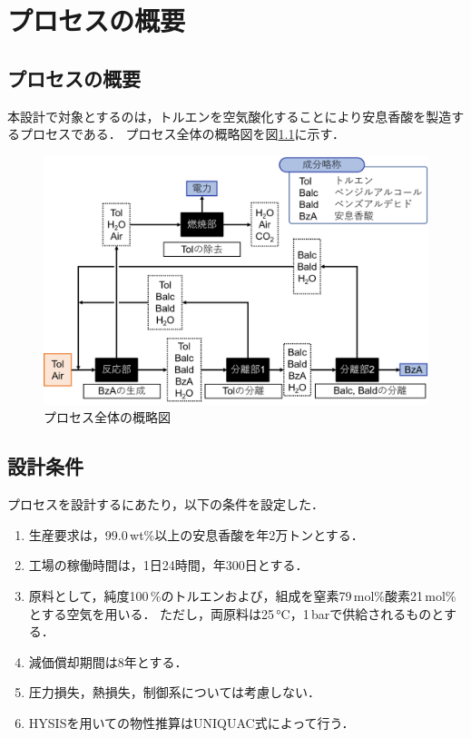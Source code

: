 \documentclass[a4j]{jsreport}
\begin{document}
\chapter{プロセスの概要}
\section{プロセスの概要}
本設計で対象とするのは，トルエンを空気酸化することにより安息香酸を製造するプロセスである．
プロセス全体の概略図を図\ref{プロセス全体の概略図}に示す．
\begin{figure}[htbp]
  \centering
  \includegraphics[scale=0.6]{processOutline.png}
  \caption{プロセス全体の概略図}
  \label{プロセス全体の概略図}
\end{figure}

\section{設計条件}
プロセスを設計するにあたり，以下の条件を設定した．
\begin{enumerate}
  \item 生産要求は，99.0\,wt\%以上の安息香酸を年2万トンとする．\\
  \item 工場の稼働時間は，1日24時間，年300日とする．\\
  \item 原料として，純度100\,\%のトルエンおよび，組成を窒素79\,mol\%酸素21\,mol\%とする空気を用いる．
           ただし，両原料は25\,\si{\degreeCelsius}，1\,\si{\bar}で供給されるものとする．\\
  \item 減価償却期間は8年とする．\\
  \item 圧力損失，熱損失，制御系については考慮しない．\\
  \item HYSISを用いての物性推算はUNIQUAC式によって行う．
\end{enumerate}
\end{document}

